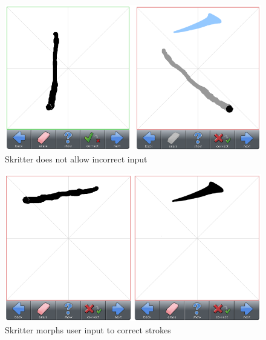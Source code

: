 \begin{figure}[htbp]
\begin{center}
\includegraphics[scale=0.6]{images/ConceptualDesign/skritter/noIncorrectInput.png}
\caption{Skritter does not allow incorrect input}
\label{fig:skritter:noIncorrectInput}
\end{center}
\end{figure}

\begin{figure}[htbp]
\begin{center}
\includegraphics[scale=0.6]{images/ConceptualDesign/skritter/morphInputToCorrectStroke.png}
\caption{Skritter morphs user input to correct strokes}
\label{fig:skritter:morphInputToCorrectStroke}
\end{center}
\end{figure}

